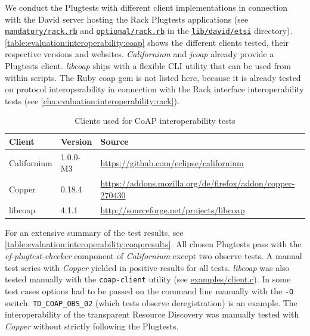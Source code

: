 			We conduct the Plugtests with different client implementations in
			connection with the David server hosting the Rack Plugtests
			applications (see
			\href{https://github.com/nning/david/blob/0.4.3/lib/david/etsi/mandatory/rack.rb}{\texttt{mandatory/rack.rb}}
			and
			\href{https://github.com/nning/david/blob/0.4.3/lib/david/etsi/optional/rack.rb}{\texttt{optional/rack.rb}}
			in the
			\href{https://github.com/nning/david/tree/0.4.3/lib/david/etsi}{\texttt{lib/david/etsi}}
			directory).  \autoref{table:evaluation:interoperability:coap} shows
			the different clients tested, their respective versions and
			websites.  \emph{Californium} and \emph{jcoap} already provide a
			Plugtests client. \emph{libcoap} ships with a flexible \ac{CLI}
			utility that can be used from within scripts. The Ruby coap gem is
			not listed here, because it is already tested on protocol
			interoperability in connection with the Rack interface
			interoperability tests (see
			\autoref{cha:evaluation:interoperability:rack}).

			\begin{table}[H]
				\begin{center}
					\begin{tabular}{l|l|l}
						Client		& Version		& Source \\
						\hline
						Californium	& 1.0.0-M3		& \url{https://github.com/eclipse/californium} \\
						Copper		& 0.18.4		& \scriptsize{\url{https://addons.mozilla.org/de/firefox/addon/copper-270430}} \\
						libcoap		& 4.1.1			& \url{http://sourceforge.net/projects/libcoap} \\
					\end{tabular}
				\end{center}
				\caption{Clients used for \ac{CoAP} interoperability tests}
				\label{table:evaluation:interoperability:coap}
			\end{table}

			For an extensive summary of the test results, see
			\autoref{table:evaluation:interoperability:coap:results}. All
			chosen Plugtests pass with the \emph{cf-plugtest-checker} component
			of \emph{Californium} except two observe tests. A manual test
			series with \emph{Copper} yielded in positive results for all
			tests. \emph{libcoap} was also tested manually with the
			\texttt{coap-client} utility (see
			\href{http://sourceforge.net/p/libcoap/code/ci/master/tree/examples/client.c}{examples/client.c}).
			In some test cases options had to be passed on the command line
			manually with the \texttt{-O} switch. \texttt{TD\_COAP\_OBS\_02}
			(which tests observe deregistration) is an example. The
			interoperability of the transparent Resource Discovery was manually
			tested with \emph{Copper} without strictly following the Plugtests.

